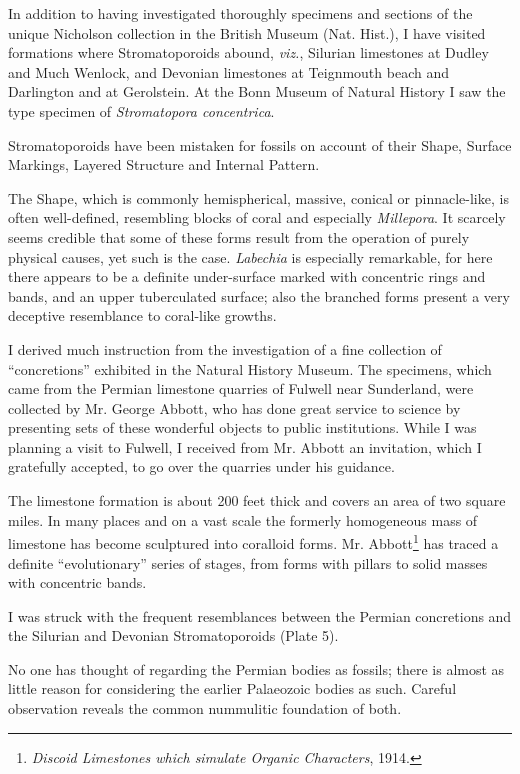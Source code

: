 \documentclass[a4paper, 12pt, oneside]{article}
\begin{document}
In addition to having investigated thoroughly specimens and sections of the unique Nicholson collection in the British Museum (Nat. Hist.), I have visited formations where Stromatoporoids abound, \emph{viz.}, Silurian limestones at Dudley and Much Wenlock, and Devonian limestones at Teignmouth beach and Darlington and at Gerolstein. At the Bonn Museum of Natural History I saw the type specimen of \emph{Stromatopora concentrica}.

Stromatoporoids have been mistaken for fossils on account of their Shape, Surface Markings, Layered Structure and Internal Pattern.

The Shape, which is commonly hemispherical, massive, conical or pinnacle-like, is often well-defined, resembling blocks of coral and especially \emph{Millepora}. It scarcely seems credible that some of these forms result from the operation of purely physical causes, yet such is the case. \emph{Labechia} is especially remarkable, for here there appears to be a definite under-surface marked with concentric rings and bands, and an upper tuberculated surface; also the branched forms present a very deceptive resemblance to coral-like growths.

I derived much instruction from the investigation of a fine collection of ``concretions'' exhibited in the Natural History Museum. The specimens, which came from the Permian limestone quarries of Fulwell near Sunderland, were collected by Mr. George Abbott, who has done great service to science by presenting sets of these wonderful objects to public institutions. While I was planning a visit to Fulwell, I received from Mr. Abbott an invitation, which I gratefully accepted, to go over the quarries under his guidance.

The limestone formation is about 200 feet thick and covers an area of two square miles. In many places and on a vast scale the formerly homogeneous mass of limestone has become sculptured into coralloid forms. Mr. Abbott\footnote{\emph{Discoid Limestones which simulate Organic Characters}, 1914.} has traced a definite ``evolutionary'' series of stages, from forms with pillars to solid masses with concentric bands.

I was struck with the frequent resemblances between the Permian concretions and the Silurian and Devonian Stromatoporoids (Plate 5).

No one has thought of regarding the Permian bodies as fossils; there is almost as little reason for considering the earlier Palaeozoic bodies as such. Careful observation reveals the common nummulitic foundation of both.
\end{document}
